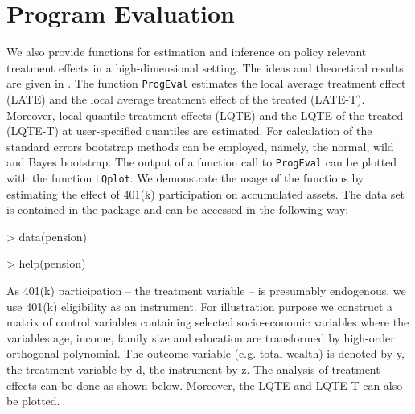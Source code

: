 \documentclass{amsart}
\begin{document}
\section{Program Evaluation}
We also provide functions for estimation and inference on policy relevant treatment effects in a high-dimensional setting. The ideas and theoretical results are given in \cite{BCFH:Policy}. The function \texttt{ProgEval} estimates the local average treatment effect (LATE) and the local average treatment effect of the treated (LATE-T). Moreover, local quantile treatment effects (LQTE) and the LQTE of the treated (LQTE-T) at user-specified quantiles are estimated. For calculation of the standard errors bootstrap methods can be employed, namely, the normal, wild and Bayes bootstrap. The output of a function call to \texttt{ProgEval} can be plotted with the function \texttt{LQplot}.
We demonstrate the usage of the functions by estimating the effect of 401(k) participation on accumulated assets. The data set is contained in the package and can be accessed in the following way:
\begin{Schunk}
\begin{Sinput}
> data(pension)
\end{Sinput}
\end{Schunk}

\begin{Schunk}
\begin{Sinput}
> help(pension)
\end{Sinput}
\end{Schunk}

As 401(k) participation -- the treatment variable -- is presumably endogenous, we use 401(k) eligibility as an instrument. For illustration purpose we construct a matrix of control variables containing selected socio-economic variables where the variables age, income, family size and education are transformed by high-order orthogonal polynomial. The outcome variable (e.g. total wealth) is denoted by y, the treatment variable by d, the instrument by z. The analysis of treatment effects can be done as shown below. Moreover, the LQTE and LQTE-T can also be plotted.
\end{document}
